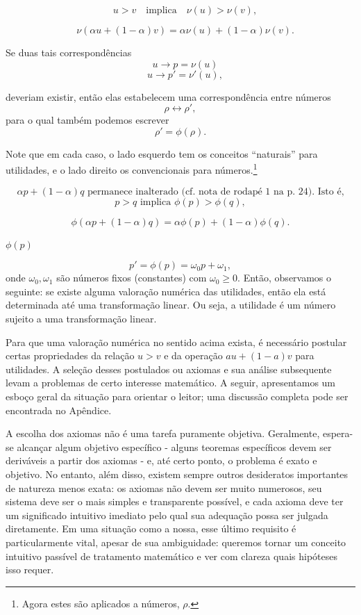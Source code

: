 \documentclass[12pt]{article}
\begin{document}
$$
\quad u > v \quad \text{implica} \quad \nu(u) > \nu(v),
$$

$$
\quad \nu(\alpha u + (1 - \alpha)v) = \alpha \nu(u) + (1 - \alpha)\nu(v).
$$

Se duas tais correspondências
$$
\quad u \rightarrow p = \nu(u)
$$
$$
\quad u \rightarrow p' = \nu'(u),
$$

deveriam existir, então elas estabelecem uma correspondência entre números
\[ \rho \leftrightarrow \rho', \]
para o qual também podemos escrever
\[ \rho' = \phi(\rho). \]

Note que em cada caso, o lado esquerdo tem os conceitos ``naturais'' para utilidades, e o lado direito os convencionais para números.\footnote{Agora estes são aplicados a números, $\rho$.}

$$
\alpha p + (1 - \alpha)q \text{ permanece inalterado (cf. nota de rodapé 1 na p. 24). Isto é,}
$$
\begin{equation}
p > q \text{ implica } \phi(p) > \phi(q),
\end{equation}

\begin{equation}
\phi(\alpha p + (1 - \alpha)q) = \alpha \phi(p) + (1 - \alpha)\phi(q).
\end{equation}

 $\phi(p)$ 

\begin{equation}
p' = \phi(p) = \omega_0 p + \omega_1,
\end{equation}
onde $\omega_0, \omega_1$ são números fixos (constantes) com $\omega_0 \geq 0$.
Então, observamos o seguinte: se existe alguma valoração numérica das utilidades, então ela está determinada até uma transformação linear. Ou seja, a utilidade é um número sujeito a uma transformação linear.

Para que uma valoração numérica no sentido acima exista, é necessário postular certas propriedades da relação \(u > v\) e da operação \(au + (1 - a)v\) para utilidades. A seleção desses postulados ou axiomas e sua análise subsequente levam a problemas de certo interesse matemático. A seguir, apresentamos um esboço geral da situação para orientar o leitor; uma discussão completa pode ser encontrada no Apêndice.

A escolha dos axiomas não é uma tarefa puramente objetiva. Geralmente, espera-se alcançar algum objetivo específico - alguns teoremas específicos devem ser deriváveis a partir dos axiomas - e, até certo ponto, o problema é exato e objetivo. No entanto, além disso, existem sempre outros desideratos importantes de natureza menos exata: os axiomas não devem ser muito numerosos, seu sistema deve ser o mais simples e transparente possível, e cada axioma deve ter um significado intuitivo imediato pelo qual sua adequação possa ser julgada diretamente. Em uma situação como a nossa, esse último requisito é particularmente vital, apesar de sua ambiguidade: queremos tornar um conceito intuitivo passível de tratamento matemático e ver com clareza quais hipóteses isso requer.
\end{document}
